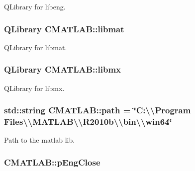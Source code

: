 Q\-Library for libeng. 

\hypertarget{class_c_m_a_t_l_a_b_ad7734632bcf702958838856f46d50f03}{
\subsubsection[{libmat}]{\setlength{\rightskip}{0pt plus 5cm}Q\-Library C\-M\-A\-T\-L\-A\-B\-::libmat\hspace{0.3cm}{\ttfamily [private]}}}\label{class_c_m_a_t_l_a_b_ad7734632bcf702958838856f46d50f03}


Q\-Library for libmat. 

\hypertarget{class_c_m_a_t_l_a_b_ab2aeeea5ac3415555fd88eedaa38b193}{
\subsubsection[{libmx}]{\setlength{\rightskip}{0pt plus 5cm}Q\-Library C\-M\-A\-T\-L\-A\-B\-::libmx\hspace{0.3cm}{\ttfamily [private]}}}\label{class_c_m_a_t_l_a_b_ab2aeeea5ac3415555fd88eedaa38b193}


Q\-Library for libmx. 

\hypertarget{class_c_m_a_t_l_a_b_a3faf4011fa6f7bdd7281e0c5ad10a970}{
\subsubsection[{path}]{\setlength{\rightskip}{0pt plus 5cm}std\-::string C\-M\-A\-T\-L\-A\-B\-::path = \char`\"{}C\-:\textbackslash{}\textbackslash{}\-Program Files\textbackslash{}\textbackslash{}\-M\-A\-T\-L\-A\-B\textbackslash{}\textbackslash{}\-R2010b\textbackslash{}\textbackslash{}bin\textbackslash{}\textbackslash{}win64\char`\"{}\hspace{0.3cm}{\ttfamily [static]}}}\label{class_c_m_a_t_l_a_b_a3faf4011fa6f7bdd7281e0c5ad10a970}


Path to the matlab lib. 

\hypertarget{class_c_m_a_t_l_a_b_a2afb20fbe0cb6886567c8ef7e024d4bf}{
\subsubsection[{p\-Eng\-Close}]{ C\-M\-A\-T\-L\-A\-B\-::p\-Eng\-Close\hspace{0.3cm}{\ttfamily [private]}}}\label{class_c_m_a_t_l_a_b_a2afb20fbe0cb6886567c8ef7e024d4bf}


